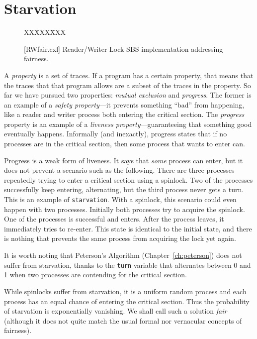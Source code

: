 \documentclass{report}
\newcommand{\cxlsource}[1]{
\begin{tabbing}
XX\=XXX\=XXX\kill
    
\end{tabbing}
}
\newenvironment{code}{
\tcolorbox
}{
\endtcolorbox
}
\begin{document}
\chapter{Starvation}
\label{ch:starvation}


\begin{figure}
\begin{code}
{\small
\cxlsource{RWfair}
}
\end{code}
\caption{[RWfair.cxl] Reader/Writer Lock SBS implementation addressing fairness.}
\label{fig:RWfair}
\end{figure}


A \emph{property}
is a set of traces.
If a program has a certain property, that means that the traces that that
program allows are a subset of the traces in the property.
So far we have pursued two properties: \emph{mutual exclusion}
and \emph{progress}.  The former is an example of a
\emph{safety property}---it prevents something ``bad'' from
happening, like a reader and writer process both entering the
critical section.  The \emph{progress} property is an example
of a \emph{liveness property}---guaranteeing that something good
eventually happens.
Informally (and inexactly), progress states that if no processes
are in the critical section, then some process that wants to enter
can.

Progress is a weak form of liveness.  It says that \emph{some}
process can enter, but it does not prevent a scenario such as
the following.  There are three processes repeatedly trying to
enter a critical section using a spinlock.  Two of
the processes successfully keep entering, alternating, but the third
process never gets a turn.  This is an example of
\texttt{starvation}.  With a spinlock, this scenario could
even happen with two processes.  Initially both processes
try to acquire the spinlock.  One of the processes is
successful and enters.  After the process leaves, it immediately
tries to re-enter.  This state is identical to the initial
state, and there is nothing that prevents the same process
from acquiring the lock yet again.

It is worth noting that Peterson's Algorithm (Chapter~\ref{ch:peterson})
does not suffer from starvation, thanks to the \texttt{turn} variable
that alternates between 0 and 1 when two processes are contending for
the critical section.

While spinlocks suffer from starvation, it is a uniform random
process and each process has an equal chance of entering the critical
section.  Thus the probability of starvation is exponentially vanishing.
We shall call such a solution \emph{fair}
(although it does not quite
match the usual formal nor vernacular concepts of fairness).
\end{document}
